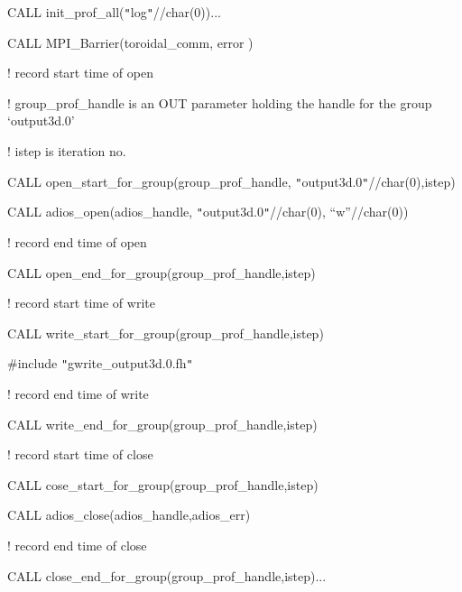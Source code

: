 \vspace{10pt}
CALL init\_prof\_all(\texttt{"}log\texttt{"}//char(0))...

\vspace{23pt}
CALL MPI\_Barrier(toroidal\_comm, error )

\vspace{23pt}
! record start time of open

\vspace{10pt}
! group\_prof\_handle is an OUT parameter holding the handle for the group `output3d.0'

\vspace{10pt}
! istep is iteration no.

\vspace{10pt}
CALL open\_start\_for\_group(group\_prof\_handle, \texttt{"}output3d.0\texttt{"}//char(0),istep)

\vspace{23pt}
CALL adios\_open(adios\_handle, \texttt{"}output3d.0\texttt{"}//char(0), ``w''//char(0))

\vspace{23pt}
! record end time of open

\vspace{10pt}
CALL open\_end\_for\_group(group\_prof\_handle,istep)

\vspace{23pt}
! record start time of write

\vspace{10pt}
CALL write\_start\_for\_group(group\_prof\_handle,istep)

\vspace{23pt}
\#include \texttt{"}gwrite\_output3d.0.fh\texttt{"}

\vspace{23pt}
! record end time of write

\vspace{10pt}
CALL write\_end\_for\_group(group\_prof\_handle,istep)

\vspace{23pt}
! record start time of close

\vspace{10pt}
CALL cose\_start\_for\_group(group\_prof\_handle,istep)

\vspace{23pt}
CALL adios\_close(adios\_handle,adios\_err)

\vspace{23pt}
! record end time of close

\vspace{10pt}
CALL close\_end\_for\_group(group\_prof\_handle,istep)...

